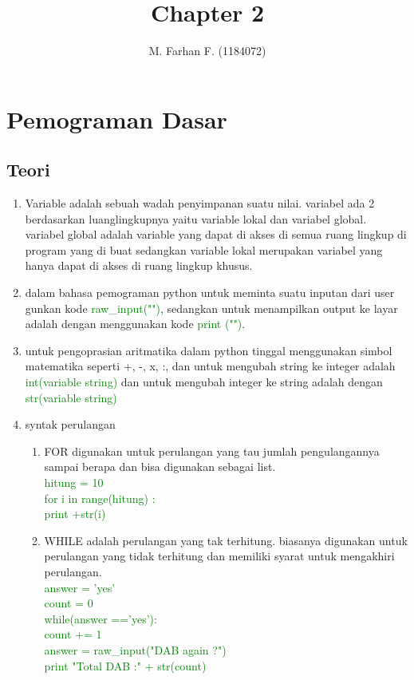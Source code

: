 \documentclass[12pt]{article}
\begin{document}
\title{Chapter 2}
\author{M. Farhan F. (1184072)}
\date{}
\maketitle

\section{Pemograman Dasar}
	\subsection{Teori}
		\begin{enumerate}
			\item Variable adalah sebuah wadah penyimpanan suatu nilai. variabel ada 2 berdasarkan luanglingkupnya yaitu variable lokal dan variabel global. variabel global adalah variable yang dapat di akses di semua ruang lingkup di program yang di buat sedangkan variable lokal merupakan variabel yang hanya dapat di akses di ruang lingkup khusus.
			\item dalam bahasa pemograman python untuk meminta 
			suatu inputan dari user gunkan kode \textcolor{green}{raw\_input("")}, sedangkan untuk menampilkan output ke layar adalah dengan menggunakan kode \textcolor{green}{print ("")}.
			\item untuk pengoprasian aritmatika dalam python tinggal menggunakan simbol matematika seperti +, -, x, :, dan untuk mengubah string ke integer adalah \textcolor{green}{int(variable string)} dan untuk mengubah integer ke string adalah dengan \textcolor{green}{str(variable string)}
			\item syntak perulangan
				\begin{enumerate}
					\item FOR digunakan untuk perulangan yang tau jumlah pengulangannya sampai berapa dan bisa digunakan sebagai list. \\
					\textcolor{green}{
					hitung = 10 \\
					for i in range(hitung) :\\
						print +str(i)}
						
					\item WHILE adalah perulangan yang tak terhitung. biasanya digunakan untuk perulangan yang tidak terhitung dan memiliki syarat untuk mengakhiri perulangan. \\
					
					\textcolor{green}{
					answer = 'yes'\\
					count = 0		\\			
					while(answer =='yes'):\\
						count += 1\\
						answer = raw\_input("DAB again ?")	\\	
					print "Total DAB :" + str(count)}\\
					

\end{enumerate}
\end{enumerate}
\end{document}
